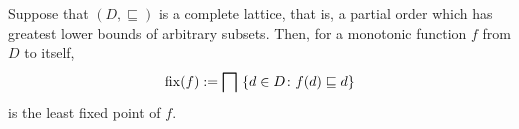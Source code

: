 \begin{thm}\label{thm:knaster-tarski} %
  Suppose that \((D, {}\sqsubseteq)\) is a complete lattice, that is, a partial order which has greatest lower bounds of arbitrary subsets.
  Then, for a monotonic function \(f\) from \(D\) to itself,
  \begin{equation}
    \fix(f) := \bigsqcap\,\,\lbrace d \in D \colon f(d) \sqsubseteq d \rbrace %
  \end{equation}
  is the least fixed point of \(f\).
\end{thm}
